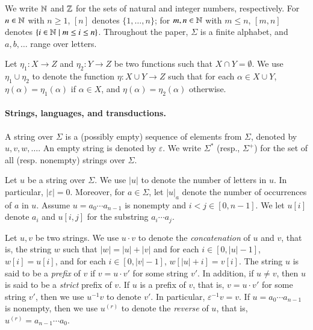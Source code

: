 
We write $\mathbb{N}$ and $\mathbb{Z}$ for the sets of natural and integer numbers, respectively. For $n \in \mathbb{N}$ with $n \ge 1$, $[n]$ denotes $\{1, \ldots, n\}$; for $m,n \in \mathbb{N}$ with $m \le n$,  $[m, n]$ denotes $\{ i \in \mathbb{N} \mid m \le i \le n \}$. Throughout the paper, $\Sigma$ is a finite alphabet, and $a,b,\ldots$ range over letters.

Let $\eta_1: X \rightarrow Z$ and $\eta_2: Y \rightarrow Z$ be two functions such that $X \cap Y = \emptyset$. We use $\eta_1 \cup \eta_2$ to denote the function $\eta: X \cup Y \rightarrow Z$ such that for each $\alpha \in X \cup Y$, $\eta(\alpha) = \eta_1(\alpha)$  if $\alpha \in X$, and $\eta(\alpha) = \eta_2(\alpha)$ otherwise. 

\paragraph*{Strings, languages, and transductions.}
A string over $\Sigma$ is a (possibly empty) sequence of elements from $\Sigma$,
denoted by $u, v, w, \ldots$. An empty string is denoted by $\varepsilon$.  We write $\Sigma^*$ (resp., $\Sigma^+$) for the set of all (resp. nonempty) strings over $\Sigma$.

Let $u$ be a string over $\Sigma$. We use $|u|$ to denote the number of letters in $u$. In particular, $|\varepsilon|=0$. Moreover, for $a \in \Sigma$, let $|u|_a$ denote the number of occurrences of $a$ in $u$. 
Assume $u=a_0\cdots a_{n-1}$ is nonempty and $i<j \in [0,n-1]$. %
We let $u[i]$ denote $a_i$ and $u[i,j]$ for the substring %
$a_i\cdots a_j$. 

Let $u, v$ be two strings. We use $u \cdot v$ to denote the \emph{concatenation} of $u$ and $v$, that is, the string $w$ such that $|w|= |u| + |v|$ and for each $i \in [0, |u|-1]$, $w[i]= u[i]$, and for each $i \in [0,|v|-1]$, $w[|u|+i]=v[i]$. The string $u$ is said to be a \emph{prefix} of $v$ if $v = u \cdot v'$ for some string $v'$.
In addition, if $u \neq v$, then $u$ is said to be a \emph{strict} prefix of $v$. If $u$ is a prefix of $v$, that is, $v = u \cdot v'$ for some string $v'$, then 
we use $u^{-1} v$ to denote $v'$. In particular, $\varepsilon^{-1} v = v$.
If $u=a_0 \cdots a_{n-1}$ is nonempty, then we use $u^{(r)}$ to denote the \emph{reverse} of $u$, that is, $u^{(r)}= a_{n-1 }\cdots a_0$. %


